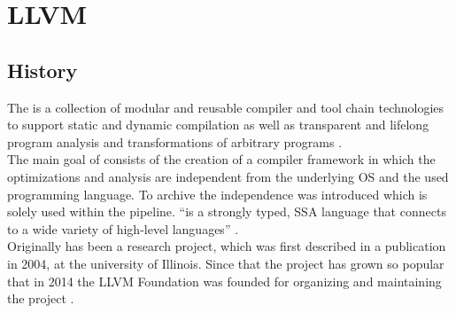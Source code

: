 \chapter{LLVM}
\section{History}
The \llvm is a collection of modular and reusable compiler and tool chain technologies to support static and dynamic compilation as well as transparent and lifelong program analysis and transformations of arbitrary programs \cite{LLVMWebsite, LLVMResearchBeginning}.\\
The main goal of \llvm consists of the creation of a compiler framework in which the optimizations and analysis are independent from the underlying OS and the used programming language.
To archive the independence \llvmir was introduced which is solely used within the pipeline.
\enquote{\llvmir is a strongly typed, \ac{SSA} language that connects to a wide variety of high-level languages} \cite{PolyhedralEmpiricalStudy}.\\
Originally \llvm has been a research project, which was first described in a publication in 2004, at the university of Illinois.
Since that the project has grown so popular that in 2014 the LLVM Foundation was founded for organizing and maintaining the project \cite{LLVMFoundation}.\\

